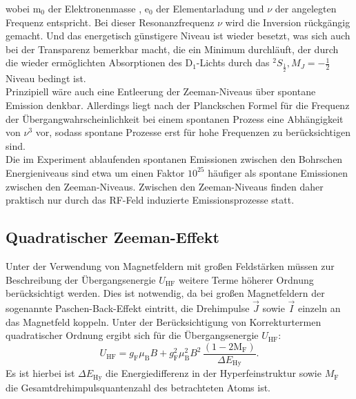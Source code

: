 wobei $\mathrm{m}_0$ der Elektronenmasse \cite{m_0}, $\mathrm{e}_0$ der
Elementarladung \cite{e} und $\nu$ der angelegten Frequenz entspricht.
Bei dieser Resonanzfrequenz $\nu$ wird die Inversion rückgängig gemacht.
Und das energetisch günstigere Niveau ist wieder besetzt, was sich auch
bei der Transparenz bemerkbar macht, die ein Minimum durchläuft, der durch die wieder
ermöglichten Absorptionen des D$_1$-Lichts durch das
$^2S_{\frac{1}{2}}, M_J = -\frac{1}{2}$ Niveau bedingt ist.\\
Prinzipiell wäre auch eine Entleerung der Zeeman-Niveaus über spontane Emission denkbar. Allerdings liegt nach der Planckschen Formel für die Frequenz der Übergangwahrscheinlichkeit bei einem spontanen Prozess eine Abhängigkeit von $\nu^3$ vor, sodass spontane Prozesse erst für hohe Frequenzen zu berücksichtigen sind.\\
Die im Experiment ablaufenden spontanen Emissionen zwischen den Bohrschen Energieniveaus sind etwa um einen Faktor $10^{25}$ häufiger als spontane Emissionen zwischen den Zeeman-Niveaus. Zwischen den Zeeman-Niveaus finden daher praktisch nur durch das RF-Feld induzierte Emissionsprozesse statt.
\subsection{Quadratischer Zeeman-Effekt}
Unter der Verwendung von Magnetfeldern mit großen Feldstärken müssen zur Beschreibung der Übergangsenergie $U_{\mathrm{HF}}$ weitere Terme höherer Ordnung berücksichtigt werden.
Dies ist notwendig, da bei großen Magnetfeldern der sogenannte Paschen-Back-Effekt eintritt, die Drehimpulse $\vec{J}$ sowie $\vec{I}$ einzeln an das Magnetfeld koppeln.
Unter der Berücksichtigung von Korrekturtermen quadratischer Ordnung ergibt sich für die Übergangsenergie $U_{\mathrm{HF}}$:
\begin{equation}
\label{eqn:quadrat_zeeman}
U_{\mathrm{HF}}=g_{\mathrm{F}}\mu_{\mathrm{B}}B+g_{\mathrm{F}}^2\mu_{\mathrm{B}}^2B^2\, \frac{\left(1-2\mathrm{M_F}\right)}{\Delta E_{\mathrm{Hy}}}	\mathrm{.}
\end{equation}
Es ist hierbei ist $\Delta E_{\mathrm{Hy}}$ die Energiedifferenz in der Hyperfeinstruktur sowie $M_{\mathrm{F}}$ die Gesamtdrehimpulsquantenzahl des betrachteten Atoms ist.
